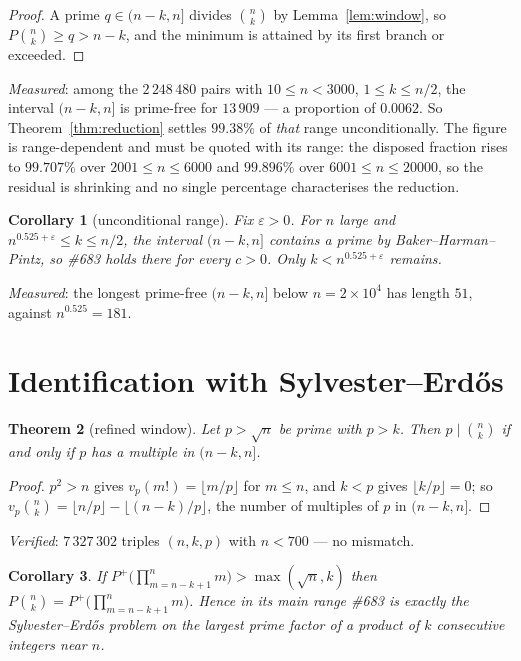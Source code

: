 \documentclass[11pt]{article}
\newtheorem{theorem}{Theorem}
\newtheorem{corollary}[theorem]{Corollary}
\begin{document}
\begin{proof}
A prime $q\in(n-k,n]$ divides $\binom nk$ by Lemma~\ref{lem:window}, so $P\binom nk\ge q>n-k$,
and the minimum is attained by its first branch or exceeded.
\end{proof}

\emph{Measured}: among the $2\,248\,480$ pairs with $10\le n<3000$, $1\le k\le n/2$, the
interval $(n-k,n]$ is prime-free for $13\,909$ --- a proportion of $0.0062$.  So
Theorem~\ref{thm:reduction} settles $99.38\%$ of \emph{that} range unconditionally.  The
figure is range-dependent and must be quoted with its range: the disposed fraction rises to
$99.707\%$ over $2001\le n\le6000$ and $99.896\%$ over $6001\le n\le20000$, so the residual
is shrinking and no single percentage characterises the reduction.

\begin{corollary}[unconditional range]\label{cor:bhp}
Fix $\varepsilon>0$.  For $n$ large and $n^{0.525+\varepsilon}\le k\le n/2$, the interval
$(n-k,n]$ contains a prime by Baker--Harman--Pintz, so \#683 holds there for every $c>0$.
Only $k<n^{0.525+\varepsilon}$ remains.
\end{corollary}

\emph{Measured}: the longest prime-free $(n-k,n]$ below $n=2\times10^{4}$ has length $51$,
against $n^{0.525}=181$.

\section{Identification with Sylvester--Erd\H{o}s}

\begin{theorem}[refined window]\label{thm:refined}
Let $p>\sqrt n$ be prime with $p>k$.  Then $p\mid\binom nk$ if and only if $p$ has a multiple
in $(n-k,n]$.
\end{theorem}

\begin{proof}
$p^2>n$ gives $v_p(m!)=\lfloor m/p\rfloor$ for $m\le n$, and $k<p$ gives
$\lfloor k/p\rfloor=0$; so $v_p\binom nk=\lfloor n/p\rfloor-\lfloor(n-k)/p\rfloor$, the
number of multiples of $p$ in $(n-k,n]$.
\end{proof}

\emph{Verified}: $7\,327\,302$ triples $(n,k,p)$ with $n<700$ --- no mismatch.

\begin{corollary}\label{cor:sylvester}
If $P^{+}\bigl(\prod_{m=n-k+1}^{n}m\bigr)>\max(\sqrt n,k)$ then
$P\binom nk=P^{+}\bigl(\prod_{m=n-k+1}^{n}m\bigr)$.  Hence in its main range \#683 is
exactly the Sylvester--Erd\H{o}s problem on the largest prime factor of a product of $k$
consecutive integers near $n$.
\end{corollary}
\end{document}
